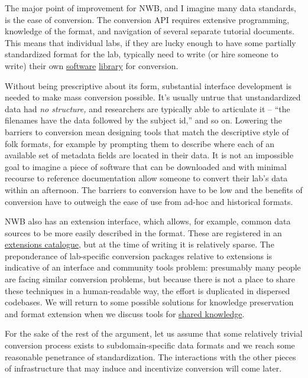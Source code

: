 \documentclass[notoc]{tufte-book}
\begin{document}
The major point of improvement for NWB, and I imagine many data
standards, is the ease of conversion. The conversion API requires
extensive programming, knowledge of the format, and navigation of
several separate tutorial documents. This means that individual labs, if
they are lucky enough to have some partially standardized format for the
lab, typically need to write (or hire someone to write) their own
\href{https://github.com/catalystneuro/tank-lab-to-nwb}{software}
\href{https://github.com/catalystneuro/mease-lab-to-nwb}{library} for
conversion.

Without being prescriptive about its form, substantial interface
development is needed to make mass conversion possible. It's usually
untrue that unstandardized data had \emph{no structure,} and researchers
are typically able to articulate it -- ``the filenames have the data
followed by the subject id,'' and so on. Lowering the barriers to
conversion mean designing tools that match the descriptive style of folk
formats, for example by prompting them to describe where each of an
available set of metadata fields are located in their data. It is not an
impossible goal to imagine a piece of software that can be downloaded
and with minimal recourse to reference documentation allow someone to
convert their lab's data within an afternoon. The barriers to conversion
have to be low and the benefits of conversion have to outweigh the ease
of use from ad-hoc and historical formats.

NWB also has an extension interface, which allows, for example, common
data sources to be more easily described in the format. These are
registered in an \href{https://nwb-extensions.github.io/}{extensions
catalogue}, but at the time of writing it is relatively sparse. The
preponderance of lab-specific conversion packages relative to extensions
is indicative of an interface and community tools problem: presumably
many people are facing similar conversion problems, but because there is
not a place to share these techniques in a human-readable way, the
effort is duplicated in dispersed codebases. We will return to some
possible solutions for knowledge preservation and format extension when
we discuss tools for \protect\hyperlink{shared-knowledge}{shared
knowledge}.

For the sake of the rest of the argument, let us assume that some
relatively trivial conversion process exists to subdomain-specific data
formats and we reach some reasonable penetrance of standardization. The
interactions with the other pieces of infrastructure that may induce and
incentivize conversion will come later.
\end{document}
